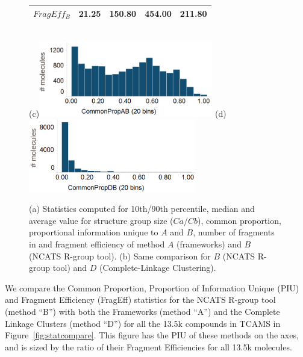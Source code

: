 \documentclass[journal=jacsat,biochem,manuscript=article]{achemso}
\newcommand*\fref[1]{Figure~\ref{fig:#1}}
\begin{document}
\begin{figure}
\begin{minipage}[c]{\linewidth}
{\begin{tabular}{|c|ccc|c|}
    {\bf $FragEff_B$} & 21.25 & 150.80 & 454.00 & 211.80 \\
    \hline
  \end{tabular}
 }\\
    (c)\includegraphics[height=1.3in]{fig/CP_TCAMS_GSKFW_RGT_v2.png}
    (d)\includegraphics[height=1.25in]{fig/CP_TCAMS_CLink_RGT_v3.png}\\
    
  \end{minipage}
  \caption{(a) Statistics computed for 10th/90th percentile, median and average value for structure group size ($Ca$/$Cb$), common proportion, proportional information unique to $A$ and $B$, number of fragments in and fragment efficiency of method $A$ (frameworks) and $B$ (NCATS R-group tool). (b) Same comparison for $B$ (NCATS R-group tool) and $D$ (Complete-Linkage Clustering).}
\label{fig:statcomparetable}
\end{figure}


We compare the Common Proportion, Proportion of Information Unique (PIU) and Fragment Efficiency (FragEff) statistics for the NCATS R-group tool (method ``B'') with both the Frameworks (method ``A'') and the Complete Linkage Clusters (method ``D'') for all the 13.5k compounds in TCAMS in \fref{statcompare}.  This figure has the PIU of these methods on the axes, and is sized by the ratio of their Fragment Efficiencies for all 13.5k molecules.   
\end{document}
